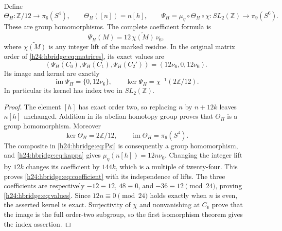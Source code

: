 \begin{theorem}
\label{h24:hbridge:peripheral-theorem}
Define
\begin{equation}
\Theta_H:\mathbb Z/12\longrightarrow\pi_6(S^4),
\qquad \Theta_H([n])=n[h],
\qquad
\Psi_H=\mu_\eta\circ\Theta_H\circ\chi:
SL_2(\mathbb Z)\longrightarrow\pi_9(S^6).
\label{h24:hbridge:eq:Psi}
\end{equation}
These are group homomorphisms. The complete coefficient formula is
\begin{equation}
\Psi_H(M)=12\,\widetilde{\chi(M)}\,\nu_6,
\label{h24:hbridge:eq:coefficient}
\end{equation}
where \(\widetilde{\chi(M)}\) is any integer lift of the
marked residue. In the original matrix order of
\eqref{h24:hbridge:eq:matrices}, its exact values are
\begin{equation}
(\Psi_H(C_0),\Psi_H(C_1),\Psi_H(C_2'))
=(12\nu_6,0,12\nu_6).
\label{h24:hbridge:eq:values}
\end{equation}
Its image and kernel are exactly
\begin{equation}
\operatorname{im}\Psi_H=\{0,12\nu_6\},\qquad
\ker\Psi_H=\chi^{-1}(2\mathbb Z/12).
\label{h24:hbridge:eq:kernel}
\end{equation}
In particular its kernel has index two in \(SL_2(\mathbb Z)\).
\end{theorem}

\begin{proof}
The element \([h]\) has exact order two, so replacing \(n\)
by \(n+12k\) leaves \(n[h]\) unchanged. Addition in its
abelian homotopy group proves that \(\Theta_H\) is a group
homomorphism. Moreover
\[
\ker\Theta_H=2\mathbb Z/12,
\qquad \operatorname{im}\Theta_H=\pi_6(S^4).
\]
The composite in \eqref{h24:hbridge:eq:Psi} is consequently a
group homomorphism, and \eqref{h24:hbridge:eq:kappa} gives
\(\mu_\eta(n[h])=12n\nu_6\). Changing the integer lift by
\(12k\) changes its coefficient by \(144k\), which is a
multiple of twenty-four. This proves
\eqref{h24:hbridge:eq:coefficient} with its independence of lifts.
The three coefficients are respectively
\(-12\equiv12\), \(48\equiv0\), and
\(-36\equiv12\pmod{24}\), proving
\eqref{h24:hbridge:eq:values}. Since \(12n\equiv0\pmod{24}\)
holds exactly when \(n\) is even, the asserted kernel is exact.
Surjectivity of \(\chi\) and nonvanishing at \(C_0\) prove
that the image is the full order-two subgroup, so the first
isomorphism theorem gives the index assertion.
\end{proof}

